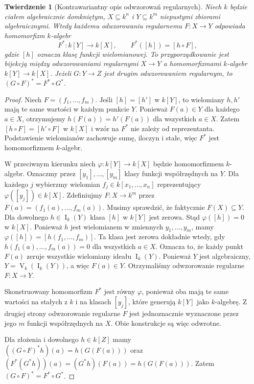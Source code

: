 \documentclass[11pt,a4paper,openany]{report}
\numberwithin{equation}{section}
\theoremstyle{plain}
\newtheorem{twierdzenie}{Twierdzenie}[section]
\theoremstyle{definition}
\theoremstyle{remark}
\newcommand{\V}{\operatorname V}
\newcommand{\I}{\operatorname I}
\begin{document}
\begin{twierdzenie}[Kontrawariantny opis odwzorowań regularnych]
\label{tw:affine-morphism}
Niech $k$ będzie ciałem algebraicznie domkniętym,
$X\subseteq k^n$ i $Y\subseteq k^m$ niepustymi zbiorami
algebraicznymi. Wtedy każdemu odwzorowaniu regularnemu
$F:X\to Y$ odpowiada homomorfizm $k$-algebr
\[
F^*:k[Y]\longrightarrow k[X],\qquad
F^*([h])=[h\circ F],
\]
gdzie $[h]$ oznacza klasę funkcji wielomianowej.
To przyporządkowanie jest bijekcją między
odwzorowaniami regularnymi $X\to Y$ a homomorfizmami
$k$-algebr $k[Y]\to k[X]$.
Jeżeli $G:Y\to Z$ jest drugim odwzorowaniem regularnym,
to $(G\circ F)^*=F^*\circ G^*$.
\end{twierdzenie}
\begin{proof}
Niech $F=(f_1,\dots,f_m)$.
Jeśli $[h]=[h']$ w $k[Y]$, to wielomiany $h,h'$ mają
te same wartości w każdym punkcie $Y$. Ponieważ $F(a)\in Y$
dla każdego $a\in X$, otrzymujemy
$h(F(a))=h'(F(a))$ dla wszystkich $a\in X$.
Zatem $[h\circ F]=[h'\circ F]$ w $k[X]$ i wzór na $F^*$
nie zależy od reprezentanta.
Podstawienie wielomianów zachowuje sumę, iloczyn i stałe,
więc $F^*$ jest homomorfizmem $k$-algebr.

W przeciwnym kierunku niech
$\varphi:k[Y]\to k[X]$ będzie homomorfizmem $k$-algebr.
Oznaczmy przez $[y_1],\dots,[y_m]$ klasy funkcji współrzędnych
na $Y$. Dla każdego $j$ wybierzmy wielomian
$f_j\in k[x_1,\dots,x_n]$ reprezentujący
$\varphi([y_j])\in k[X]$.
Zdefiniujmy $F:X\to k^m$ przez
$F(a)=(f_1(a),\dots,f_m(a))$.
Musimy sprawdzić, że faktycznie $F(X)\subseteq Y$.
Dla dowolnego $h\in\I_k(Y)$ klasa $[h]$ w $k[Y]$ jest zerowa.
Stąd $\varphi([h])=0$ w $k[X]$.
Ponieważ $h$ jest wielomianem w zmiennych $y_1,\dots,y_m$,
mamy $\varphi([h])=[h(f_1,\dots,f_m)]$.
Ta klasa jest zerowa dokładnie wtedy, gdy
$h(f_1(a),\dots,f_m(a))=0$ dla wszystkich $a\in X$.
Oznacza to, że każdy punkt $F(a)$ zeruje wszystkie wielomiany
ideału $\I_k(Y)$. Ponieważ $Y$ jest algebraiczny,
$Y=\V_k(\I_k(Y))$, a więc $F(a)\in Y$.
Otrzymaliśmy odwzorowanie regularne $F:X\to Y$.

Skonstruowany homomorfizm $F^*$ jest równy $\varphi$,
ponieważ oba mają te same wartości na stałych z $k$
i na klasach $[y_j]$, które generują $k[Y]$ jako $k$-algebrę.
Z drugiej strony odwzorowanie regularne $F$ jest jednoznacznie
wyznaczone przez jego $m$ funkcji współrzędnych na $X$.
Obie konstrukcje są więc odwrotne.

Dla złożenia i dowolnego $h\in k[Z]$ mamy
$((G\circ F)^*h)(a)=h(G(F(a)))$
oraz $(F^*(G^*h))(a)=(G^*h)(F(a))=h(G(F(a)))$.
Zatem $(G\circ F)^*=F^*\circ G^*$.
\end{proof}
\end{document}
